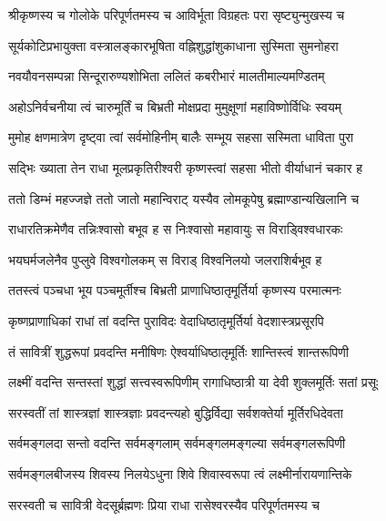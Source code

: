 

\twolineshloka
{श्रीकृष्णस्य च गोलोके परिपूर्णतमस्य च}
{आविर्भूता विग्रहतः परा सृष्ट्युन्मुखस्य च}

\twolineshloka
{सूर्यकोटिप्रभायुक्ता वस्त्रालङ्कारभूषिता}
{वह्निशुद्धांशुकाधाना सुस्मिता सुमनोहरा}

\twolineshloka
{नवयौवनसम्पन्ना सिन्दूरारुण्यशोभिता}
{ललितं कबरीभारं मालतीमाल्यमण्डितम्}

\twolineshloka
{अहोऽनिर्वचनीया त्वं चारुमूर्तिं च बिभ्रती}
{मोक्षप्रदा मुमुक्षूणां महाविष्णोर्विधिः स्वयम्}

\twolineshloka
{मुमोह क्षणमात्रेण दृष्ट्वा त्वां सर्वमोहिनीम्}
{बालैः सम्भूय सहसा सस्मिता धाविता पुरा}

\twolineshloka
{सद्भिः ख्याता तेन राधा मूलप्रकृतिरीश्वरी}
{कृष्णस्त्वां सहसा भीतो वीर्याधानं चकार ह}

\twolineshloka
{ततो डिम्भं महज्जज्ञे ततो जातो महान्विराट्}
{यस्यैव लोमकूपेषु ब्रह्माण्डान्यखिलानि च}

\twolineshloka
{राधारतिक्रमेणैव तन्निःश्वासो बभूव ह}
{स निःश्वासो महावायुः स विराड्\mbox{}विश्वधारकः}

\twolineshloka
{भयघर्मजलेनैव पुप्लुवे विश्वगोलकम्}
{स विराड् विश्वनिलयो जलराशिर्बभूव ह}

\twolineshloka
{ततस्त्वं पञ्चधा भूय पञ्चमूर्तीश्च बिभ्रती}
{प्राणाधिष्ठातृमूर्तिर्या कृष्णस्य परमात्मनः}

\twolineshloka
{कृष्णप्राणाधिकां राधां तां वदन्ति पुराविदः}
{वेदाधिष्ठातृमूर्तिर्या वेदशास्त्रप्रसूरपि}

\twolineshloka
{तं सावित्रीं शुद्धरूपां प्रवदन्ति मनीषिणः}
{ऐश्वर्याधिष्ठातृमूर्तिः शान्तिस्त्वं शान्तरूपिणी}

\twolineshloka
{लक्ष्मीं वदन्ति सन्तस्तां शुद्धां सत्त्‍‌वस्वरूपिणीम्}
{रागाधिष्ठात्री या देवी शुक्लमूर्तिः सतां प्रसूः}

\twolineshloka
{सरस्वतीं तां शास्त्रज्ञां शास्त्रज्ञाः प्रवदन्त्यहो}
{बुद्धिर्विद्या सर्वशक्तेर्या मूर्तिरधिदेवता}

\twolineshloka
{सर्वमङ्गलदा सन्तो वदन्ति सर्वमङ्गलाम्}
{सर्वमङ्गलमङ्गल्या सर्वमङ्गलरूपिणी}

\twolineshloka
{सर्वमङ्गलबीजस्य शिवस्य निलयेऽधुना}
{शिवे शिवास्वरूपा त्वं लक्ष्मीर्नारायणान्तिके}

\twolineshloka
{सरस्वती च सावित्री वेदसू‌र्ब्रह्मणः प्रिया}
{राधा रासेश्वरस्यैव परिपूर्णतमस्य च}

